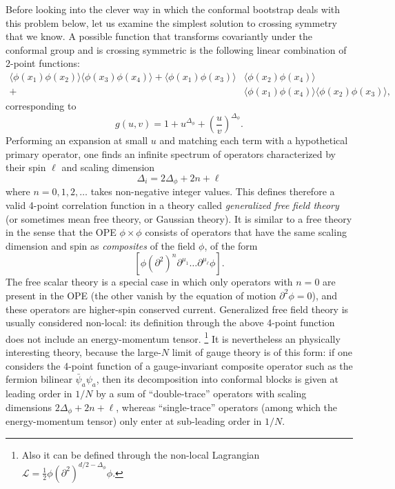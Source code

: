 \documentclass[a4paper,12pt]{article}
\numberwithin{equation}{section}
\begin{document}
Before looking into the clever way in which the conformal bootstrap deals with this problem below, let us examine the simplest solution to crossing symmetry that we know.
A possible function that transforms covariantly under the conformal group and is crossing symmetric is the following linear combination of 2-point functions:
\begin{align}
	\langle \phi(x_1) \phi(x_2) \rangle
	\langle \phi(x_3) \phi(x_4) \rangle
	+ \langle \phi(x_1) \phi(x_3) \rangle &
	\langle \phi(x_2) \phi(x_4) \rangle
	\nonumber \\
	+ & 
	\langle \phi(x_1) \phi(x_4) \rangle
	\langle \phi(x_2) \phi(x_3) \rangle,
\end{align}
corresponding to
\begin{equation}
	g(u,v) = 1 + u^{\Delta_\phi}
	+ \left( \frac{u}{v} \right)^{\Delta_\phi}.
\end{equation}
Performing an expansion at small $u$ and matching each term with a hypothetical primary operator, one finds an infinite spectrum of operators characterized by their spin $\ell$ and scaling dimension
\begin{equation}
	\Delta_i = 2\Delta_\phi + 2n + \ell
\end{equation}
where $n = 0, 1, 2, \ldots$ takes non-negative integer values.
This defines therefore a valid 4-point correlation function in a theory called \emph{generalized free field theory} (or sometimes mean free theory, or Gaussian theory). It is similar to a free theory in the sense that the OPE $\phi \times \phi$ consists of operators that have the same scaling dimension and spin as \emph{composites} of the field $\phi$, of the form
\begin{equation}
	\left[ \phi (\partial^2)^n \partial^{\mu_1} \ldots 
	\partial^{\mu_\ell} \phi \right].
\end{equation}
The free scalar theory is a special case in which only operators with $n = 0$ are present in the OPE (the other vanish by the equation of motion $\partial^2 \phi = 0$), and these operators are higher-spin conserved current.
Generalized free field theory is usually considered non-local: its definition through the above 4-point function does not include an energy-momentum tensor.%
%
\footnote{Also it can be defined through the non-local Lagrangian 
$\mathscr{L} = \frac{1}{2} \phi (\partial^2)^{d/2 - \Delta_\phi} \phi$.}
%
It is nevertheless an physically interesting theory, because the large-$N$ limit of gauge theory is of this form: if one considers the 4-point function of a gauge-invariant composite operator such as the fermion bilinear $\bar{\psi}_a \psi_a$, then its decomposition into conformal blocks is given at leading order in $1/N$ by a sum of ``double-trace'' operators with scaling dimensions $2 \Delta_\phi + 2n + \ell$, whereas ``single-trace'' operators (among which the energy-momentum tensor) only enter at sub-leading order in $1/N$.
\end{document}
